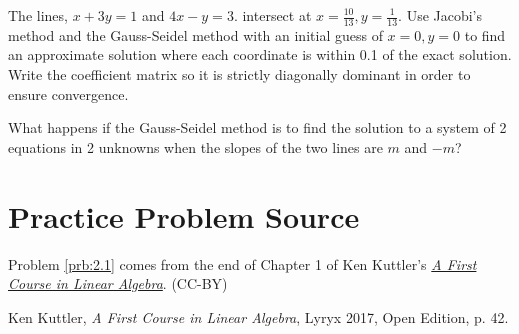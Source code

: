 \documentclass{ximera}
\begin{document}
\begin{problem}\label{prb:2.1}
The lines, $x+3y=1$ and $4x-y=3.$ intersect at $x=\frac{10}{13},y=\frac{1}{13}$.  Use Jacobi's method and the Gauss-Seidel method with an initial guess of $x=0,y=0$ to find an approximate solution where each coordinate is within 0.1 of the exact solution.  Write the coefficient matrix so it is strictly diagonally dominant in order to ensure convergence.
\end{problem}

\begin{problem}\label{prob:special_slopes}
What happens if the Gauss-Seidel method is to find the solution to a system of 2 equations in 2 unknowns when the slopes of the two lines are $m$ and $-m$?
\end{problem}


\section*{Practice Problem Source}
Problem \ref{prb:2.1} comes from the end of Chapter 1 of Ken Kuttler's \href{https://open.umn.edu/opentextbooks/textbooks/a-first-course-in-linear-algebra-2017}{\it A First Course in Linear Algebra}. (CC-BY)

Ken Kuttler, {\it  A First Course in Linear Algebra}, Lyryx 2017, Open Edition, p. 42. 
\end{document}
